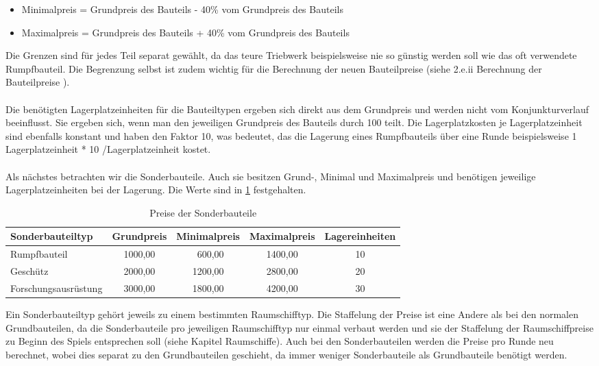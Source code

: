 \begin{itemize}
\item[] Minimalpreis = Grundpreis des Bauteils - 40\% vom Grundpreis des Bauteils
\item[] Maximalpreis = Grundpreis des Bauteils + 40\% vom Grundpreis des Bauteils
\end{itemize}

Die Grenzen sind für jedes Teil separat gewählt, da das teure Triebwerk beispielsweise nie so günstig werden soll wie das oft verwendete Rumpfbauteil. Die Begrenzung selbst ist zudem wichtig für die Berechnung der neuen Bauteilpreise (siehe 2.e.ii Berechnung der Bauteilpreise ). 
\\
\\
Die benötigten Lagerplatzeinheiten für die Bauteiltypen ergeben sich direkt aus dem Grundpreis und werden nicht vom Konjunkturverlauf beeinflusst. Sie ergeben sich, wenn man den jeweiligen Grundpreis des Bauteils durch 100 teilt. Die Lagerplatzkosten je Lagerplatzeinheit sind ebenfalls konstant und haben den Faktor 10, was bedeutet, das die Lagerung eines Rumpfbauteils über eine Runde beispielsweise 1 Lagerplatzeinheit * 10  \curr{}/Lagerplatzeinheit kostet.
\\
\\ 
Als nächstes betrachten wir die Sonderbauteile. Auch sie besitzen Grund-, Minimal und Maximalpreis und benötigen jeweilige Lagerplatzeinheiten bei der Lagerung. Die Werte sind in \ref{tab:spielwelt-datenbasis-raumschiffe-raumschiffbauteile-1} festgehalten.

\begin{table}[ht]\small
     \centering
     \begin{tabular}{ | l | c | c | c | c |   }
          \hline
          Sonderbauteiltyp & Grundpreis & Minimalpreis & Maximalpreis & Lagereinheiten \\
          \hline \hline
          Rumpfbauteil & 1000,00\curr{} & \ 600,00\curr{} & 1400,00\curr{} & 10 \\ \hline
          Geschütz & 2000,00\curr{} & 1200,00\curr{} & 2800,00\curr{} & 20 \\ \hline
          Forschungsausrüstung & 3000,00\curr{} & 1800,00\curr{} & 4200,00\curr{} & 30 \\
          \hline
     \end{tabular}
     \caption{Preise der Sonderbauteile}
     \label{tab:spielwelt-datenbasis-raumschiffe-raumschiffbauteile-1}
\end{table}

Ein Sonderbauteiltyp gehört jeweils zu einem bestimmten Raumschifftyp. Die Staffelung der Preise ist eine Andere als bei den normalen Grundbauteilen, da die Sonderbauteile pro jeweiligen Raumschifftyp nur einmal verbaut werden und sie der Staffelung der Raumschiffpreise zu Beginn des Spiels entsprechen soll (siehe Kapitel Raumschiffe). Auch bei den Sonderbauteilen werden die Preise pro Runde neu berechnet, wobei dies separat zu den Grundbauteilen geschieht, da immer weniger Sonderbauteile als Grundbauteile benötigt werden.




